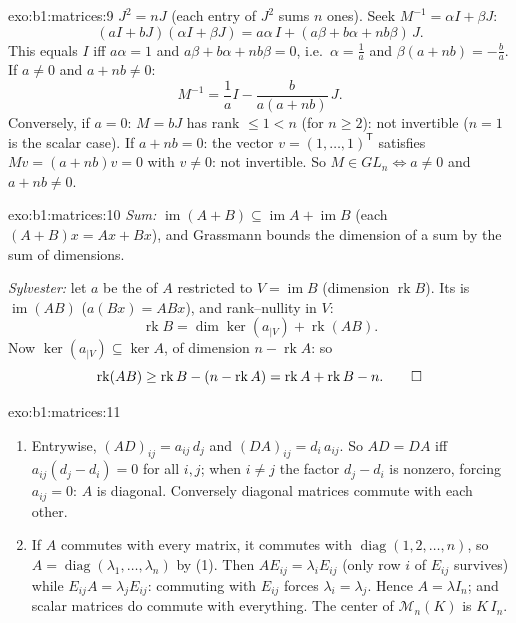 \begin{solution}{exo:b1:matrices:9}
$J^2 = nJ$ (each entry of $J^2$ sums $n$ ones). Seek $M^{-1} =
\alpha I + \beta J$:
\[
(aI + bJ)(\alpha I + \beta J)
= a\alpha\, I + (a\beta + b\alpha + nb\beta)\, J .
\]
This equals $I$ iff $a\alpha = 1$ and $a\beta + b\alpha + nb\beta =
0$, i.e.\ $\alpha = \frac1a$ and $\beta(a + nb) = -\frac ba$. If $a
\neq 0$ and $a + nb \neq 0$:
\[
M^{-1} = \frac 1a I - \frac{b}{a(a + nb)}\, J .
\]
Conversely, if $a = 0$: $M = bJ$ has rank $\leq 1 < n$ (for $n \geq
2$): not invertible ($n = 1$ is the scalar case). If $a + nb = 0$:
the vector $v = (1, \dots, 1)^{\mathsf T}$ satisfies $Mv = (a +
nb)v = 0$ with $v \neq 0$: not invertible. So $M \in GL_n \iff a
\neq 0$ and $a + nb \neq 0$.
\end{solution}

\begin{solution}{exo:b1:matrices:10}
\emph{Sum:} $\operatorname{im}(A + B) \subseteq \operatorname{im} A
+ \operatorname{im} B$ (each $(A+B)x = Ax + Bx$), and Grassmann
bounds the dimension of a sum by the sum of dimensions.

\emph{Sylvester:} let $a$ be the  of $A$ restricted to $V =
\operatorname{im} B$ (dimension $\operatorname{rk} B$). Its  is
$\operatorname{im}(AB)$ ($a(Bx) = ABx$), and rank--nullity in $V$:
\[
\operatorname{rk} B = \dim\ker(a_{|V}) + \operatorname{rk}(AB) .
\]
Now $\ker(a_{|V}) \subseteq \ker A$, of dimension $n -
\operatorname{rk} A$: so
\[
\operatorname{rk}(AB) \geq \operatorname{rk} B - (n -
\operatorname{rk} A) = \operatorname{rk} A + \operatorname{rk} B -
n . \qedhere
\]
\end{solution}

\begin{solution}{exo:b1:matrices:11}
\begin{enumerate}
  \item Entrywise, $(AD)_{ij} = a_{ij}\,d_j$ and $(DA)_{ij} =
        d_i\,a_{ij}$. So $AD = DA$ iff $a_{ij}(d_j - d_i) = 0$
        for all $i, j$; when $i \neq j$ the factor $d_j - d_i$ is
        nonzero, forcing $a_{ij} = 0$: $A$ is diagonal.
        Conversely diagonal matrices commute with each other.
  \item If $A$ commutes with every matrix, it commutes with
        $\operatorname{diag}(1, 2, \dots, n)$, so $A =
        \operatorname{diag}(\lambda_1, \dots, \lambda_n)$ by (1).
        Then $A E_{ij} = \lambda_i E_{ij}$ (only row $i$ of
        $E_{ij}$ survives) while $E_{ij} A = \lambda_j E_{ij}$:
        commuting with $E_{ij}$ forces $\lambda_i = \lambda_j$.
        Hence $A = \lambda I_n$; and scalar matrices do commute
        with everything. The center of $\mathcal{M}_n(K)$ is
        $K\,I_n$.
\end{enumerate}
\end{solution}

